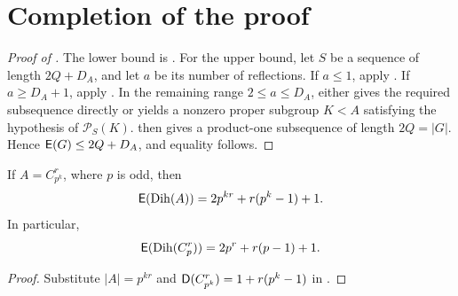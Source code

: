 \section{Completion of the proof}\label{sec:completion}

\begin{proof}[Proof of ]
The lower bound is . For the upper bound, let
\(S\) be a sequence of length \(2Q+D_A\), and let \(a\) be its number
of reflections. If \(a\le1\), apply . If
\(a\ge D_A+1\), apply . In the remaining
range \(2\le a\le D_A\),  either gives the
required subsequence directly or yields a nonzero proper subgroup
\(K<A\) satisfying the hypothesis of \(\mathcal P_S(K)\).
 then gives a product-one subsequence of
length \(2Q=|G|\). Hence \(\mathsf E(G)\le2Q+D_A\), and equality follows.
\end{proof}

\begin{corollary}\label{cor:homocyclic}
If \(A=C_{p^k}^r\), where \(p\) is odd, then
\[
  \mathsf E(\operatorname{Dih}(A))=2p^{kr}+r(p^k-1)+1.
\]
In particular,
\[
  \mathsf E(\operatorname{Dih}(C_p^r))=2p^r+r(p-1)+1.
\]
\end{corollary}

\begin{proof}
Substitute \(|A|=p^{kr}\) and
\(\mathsf D(C_{p^k}^r)=1+r(p^k-1)\) in .
\end{proof}
